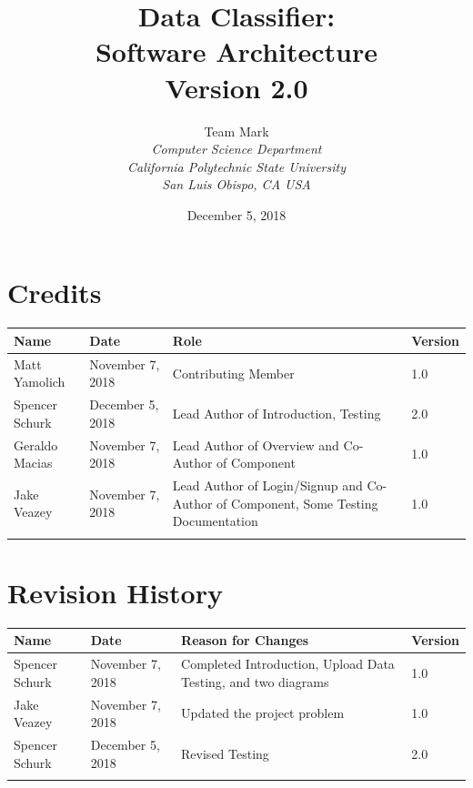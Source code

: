 \documentclass[12pt,oneside,letterpaper]{article}
\begin{document}
\title{\bfseries Data Classifier: \\
Software Architecture\\
Version 2.0}

\author {
\large{Team Mark}\\
\emph{Computer Science Department}\\
\emph{California Polytechnic State University}\\
\emph{San Luis Obispo, CA USA}\\
}

\date{December 5, 2018}
\maketitle \thispagestyle{empty}

\pagebreak
\tableofcontents



\section*{Credits}
\begin{tabular}{|l|l|p{2.5in}|l|}
\hline
\textbf{Name}&\textbf{Date}&\textbf{Role}&\textbf{Version}\\
\hline
Matt Yamolich &November 7, 2018&Contributing Member&1.0\\
\hline
Spencer Schurk&December 5, 2018&Lead Author of Introduction, Testing&2.0\\
\hline
Geraldo Macias&November 7, 2018&Lead Author of Overview and Co-Author of Component&1.0\\
\hline
Jake Veazey&November 7, 2018&Lead Author of Login/Signup and Co-Author of Component, Some Testing Documentation&1.0\\
\hline
&&&\\
\hline
\end{tabular}

\section*{Revision History}
\begin{tabular}{|l|l|p{2.5in}|l|}
\hline
\textbf{Name}&\textbf{Date}&\textbf{Reason for Changes}&\textbf{Version}\\
\hline
Spencer Schurk&November 7, 2018&Completed Introduction, Upload Data Testing, and two diagrams&1.0\\
\hline
Jake Veazey&November 7, 2018&Updated the project problem&1.0\\
\hline
Spencer Schurk&December 5, 2018&Revised Testing&2.0\\
\hline
&&&\\
\hline
\end{tabular}
\end{document}
